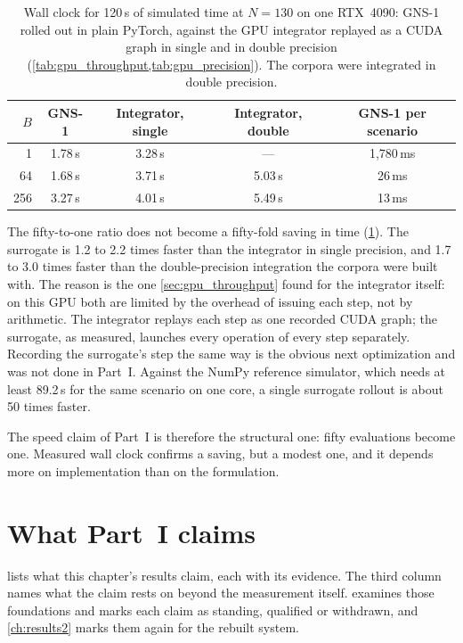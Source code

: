 \begin{table}[htbp]
    \centering
    \begin{tabular}{rcccc}
        \toprule
        $B$ & GNS-1 & Integrator, single & Integrator, double & GNS-1 per scenario \\
        \midrule
        1   & 1.78\,s & 3.28\,s & --- & 1,780\,ms \\
        64  & 1.68\,s & 3.71\,s & 5.03\,s & 26\,ms \\
        256 & 3.27\,s & 4.01\,s & 5.49\,s & 13\,ms \\
        \bottomrule
    \end{tabular}
    \caption{Wall clock for 120\,s of simulated time at $N = 130$ on one RTX~4090: GNS-1 rolled out in plain PyTorch, against the GPU integrator replayed as a CUDA graph in single and in double precision (\cref{tab:gpu_throughput,tab:gpu_precision}). The corpora were integrated in double precision.}
    \label{tab:train_cost}
\end{table}

The fifty-to-one ratio does not become a fifty-fold saving in time (\cref{tab:train_cost}). The surrogate is 1.2 to 2.2 times faster than the integrator in single precision, and 1.7 to 3.0 times faster than the double-precision integration the corpora were built with. The reason is the one \cref{sec:gpu_throughput} found for the integrator itself: on this GPU both are limited by the overhead of issuing each step, not by arithmetic. The integrator replays each step as one recorded CUDA graph; the surrogate, as measured, launches every operation of every step separately. Recording the surrogate's step the same way is the obvious next optimization and was not done in Part~I. Against the NumPy reference simulator, which needs at least 89.2\,s for the same scenario on one core, a single surrogate rollout is about 50 times faster.

The speed claim of Part~I is therefore the structural one: fifty evaluations become one. Measured wall clock confirms a saving, but a modest one, and it depends more on implementation than on the formulation.

\section{What Part~I claims}
\label{sec:train_claims}

 lists what this chapter's results claim, each with its evidence. The third column names what the claim rests on beyond the measurement itself.  examines those foundations and marks each claim as standing, qualified or withdrawn, and \cref{ch:results2} marks them again for the rebuilt system.

